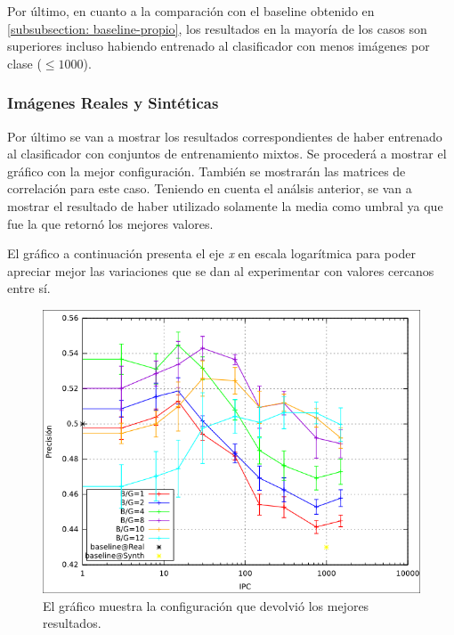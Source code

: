 	Por último, en cuanto a la comparación con el baseline obtenido en \ref{subsubsection: baseline-propio}, los resultados en la mayoría de los casos son superiores incluso habiendo entrenado al clasificador con menos imágenes por clase ($\leq 1000$).

\newpage
    	\subsubsection{Imágenes Reales y Sintéticas}

	Por último se van a mostrar los resultados correspondientes de haber entrenado al clasificador con conjuntos de entrenamiento mixtos. Se procederá a mostrar el gráfico con la mejor configuración. También se mostrarán las matrices de correlación para este caso. Teniendo en cuenta el análsis anterior, se van a mostrar el resultado de haber utilizado solamente la media como umbral ya que fue la que retornó los mejores valores.

	El gráfico a continuación presenta el eje \textit{x} en escala logarítmica para poder apreciar mejor las variaciones que se dan al experimentar con valores cercanos entre sí.

			\begin{figure}[!htbp]
				\centering
				\centerline{
					\includegraphics[scale=0.6]{img/resultados/mixtas/best_mean_2040.png}
				}
				\caption[Mixtas media mejor resultado]{El gráfico muestra la configuración que devolvió los mejores resultados.}
				\label{fig: Mixtas-media-mejor}
			\end{figure}

